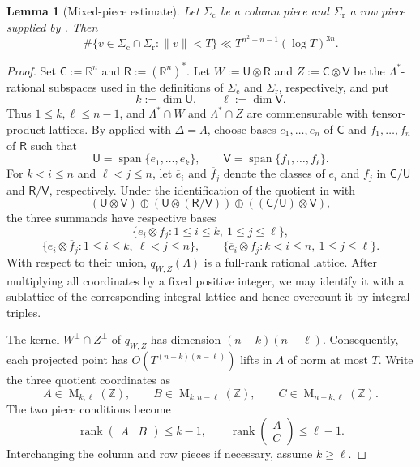 \documentclass[reqno,11pt]{amsart}
\numberwithin{equation}{section}
\newtheorem{lemma}[theorem]{Lemma}
\theoremstyle{definition}
\theoremstyle{remark}
\newcommand{\op}{\operatorname}
\newcommand{\rank}{\op{rank}}
\newcommand{\M}{\op{M}}
\begin{document}
\begin{lemma}[Mixed-piece estimate]
\label{lem:mixed-isotropic-pieces}
Let $\Sigma_{\mathrm c}$ be a column piece and
$\Sigma_{\mathrm r}$ a row piece supplied by
. Then
$$
\#\{v\in\Sigma_{\mathrm c}\cap\Sigma_{\mathrm r}:\|v\|< T\}
\ll
T^{n^2-n-1}(\log T)^{3n}.
$$
\end{lemma}

\begin{proof}
Set $\mathsf C:=\mathbb R^n$ and $\mathsf R:=(\mathbb R^n)^*$. Let
$
W:=\mathsf U\otimes\mathsf R$ and
$Z:=\mathsf C\otimes\mathsf V$
be the $\Lambda^*$-rational subspaces used in the definitions of
$\Sigma_{\mathrm c}$ and $\Sigma_{\mathrm r}$, respectively, and put
$$
k:=\dim\mathsf U,
\qquad
\ell:=\dim\mathsf V.
$$
Thus $1\le k,\ell\le n-1$, and $\Lambda^*\cap W$ and
$\Lambda^*\cap Z$ are commensurable with tensor-product lattices. By
 applied with $\Delta=\Lambda$,  choose bases $e_1,\ldots,e_n$ of $\mathsf C$ and
$f_1,\ldots,f_n$ of $\mathsf R$ such that
$$
\mathsf U=\operatorname{span}\{e_1,\ldots,e_k\},
\qquad
\mathsf V=\operatorname{span}\{f_1,\ldots,f_\ell\}.
$$
For $k<i\le n$ and $\ell<j\le n$, let $\overline e_i$ and
$\overline f_j$ denote the classes of $e_i$ and $f_j$ in
$\mathsf C/\mathsf U$ and $\mathsf R/\mathsf V$, respectively. Under the identification
of the quotient in  with
$$
(\mathsf U\otimes\mathsf V)
\oplus
(\mathsf U\otimes(\mathsf R/\mathsf V))
\oplus
((\mathsf C/\mathsf U)\otimes\mathsf V),
$$
the three summands have respective bases
$$
\{e_i\otimes f_j:1\le i\le k,\ 1\le j\le\ell\},
$$
$$
\{e_i\otimes\overline f_j:1\le i\le k,\ \ell<j\le n\},
\qquad
\{\overline e_i\otimes f_j:k<i\le n,\ 1\le j\le\ell\}.
$$
With respect to their union, $q_{W,Z}(\Lambda)$ is a full-rank rational
lattice. After multiplying all coordinates by a fixed positive integer, we
may identify it with a sublattice of the corresponding integral lattice and
hence overcount it by integral triples.

The kernel $W^\perp\cap Z^\perp$ of $q_{W,Z}$ has dimension
$(n-k)(n-\ell)$. Consequently, each projected point has
$O(T^{(n-k)(n-\ell)})$ lifts in $\Lambda$ of norm at most $T$. Write the
three quotient coordinates as
$$
A\in\M_{k,\ell}(\mathbb Z),
\qquad
B\in\M_{k,n-\ell}(\mathbb Z),
\qquad
C\in\M_{n-k,\ell}(\mathbb Z).
$$
The two piece conditions become
\begin{equation}\label{eq:mixed-rank-conditions}
\rank\begin{pmatrix}A&B\end{pmatrix}\le k-1,
\qquad
\rank\begin{pmatrix}A\\ C\end{pmatrix}\le\ell-1.
\end{equation}
Interchanging the column and row pieces if necessary, assume $k\ge\ell$.


\end{proof}
\end{document}
